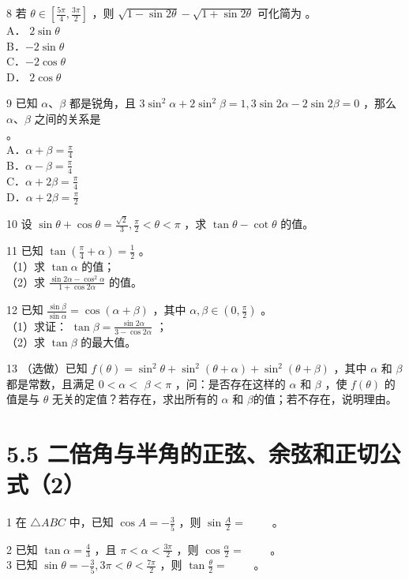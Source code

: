 \documentclass[10pt]{article}
\begin{document}
8 若 \(\theta \in\left[\frac{5 \pi}{4}, \frac{3 \pi}{2}\right]\) ，则 \(\sqrt{1-\sin 2 \theta}-\sqrt{1+\sin 2 \theta}\) 可化简为 。\\
A． \(2 \sin \theta\)\\
B．\(-2 \sin \theta\)\\
C．\(-2 \cos \theta\)\\
D． \(2 \cos \theta\)

9 已知 \(\alpha 、 \beta\) 都是锐角，且 \(3 \sin ^{2} \alpha+2 \sin ^{2} \beta=1,3 \sin 2 \alpha-2 \sin 2 \beta=0\) ，那么 \(\alpha 、 \beta\) 之间的关系是\\
。\\
A．\(\alpha+\beta=\frac{\pi}{4}\)\\
B．\(\alpha-\beta=\frac{\pi}{4}\)\\
C．\(\alpha+2 \beta=\frac{\pi}{4}\)\\
D．\(\alpha+2 \beta=\frac{\pi}{2}\)

10 设 \(\sin \theta+\cos \theta=\frac{\sqrt{2}}{3}, \frac{\pi}{2}<\theta<\pi\) ，求 \(\tan \theta-\cot \theta\) 的值。

11 已知 \(\tan \left(\frac{\pi}{4}+\alpha\right)=\frac{1}{2}\) 。\\
（1）求 \(\tan \alpha\) 的值；\\
（2）求 \(\frac{\sin 2 \alpha-\cos ^{2} \alpha}{1+\cos 2 \alpha}\) 的值。

12 已知 \(\frac{\sin \beta}{\sin \alpha}=\cos (\alpha+\beta)\) ，其中 \(\alpha, \beta \in\left(0, \frac{\pi}{2}\right)\) 。\\
（1）求证： \(\tan \beta=\frac{\sin 2 \alpha}{3-\cos 2 \alpha}\) ；\\
（2）求 \(\tan \beta\) 的最大值。

13 （选做）已知 \(f(\theta)=\sin ^{2} \theta+\sin ^{2}(\theta+\alpha)+\sin ^{2}(\theta+\beta)\) ，其中 \(\alpha\) 和 \(\beta\) 都是常数，且满足 \(0<\alpha<\) \(\beta<\pi\) ，问：是否存在这样的 \(\alpha\) 和 \(\beta\) ，使 \(f(\theta)\) 的值是与 \(\theta\) 无关的定值？若存在，求出所有的 \(\alpha\) 和 \(\beta\)的值；若不存在，说明理由。

\section*{5.5 二倍角与半角的正弦、余弦和正切公式（2）}
1 在 \(\triangle A B C\) 中，已知 \(\cos A=-\frac{3}{5}\) ，则 \(\sin \frac{A}{2}=\) \(\qquad\)。

2 已知 \(\tan \alpha=\frac{4}{3}\) ，且 \(\pi<\alpha<\frac{3 \pi}{2}\) ，则 \(\cos \frac{\alpha}{2}=\) \(\qquad\)。\\
3 已知 \(\sin \theta=-\frac{3}{5}, 3 \pi<\theta<\frac{7 \pi}{2}\) ，则 \(\tan \frac{\theta}{2}=\) \(\qquad\)。
\end{document}
